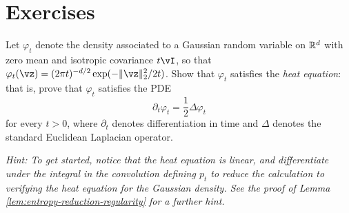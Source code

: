 \documentclass[../../book-main.tex]{subfiles}
\begin{document}
\section{Exercises}

\begin{exercise}\label{exercise:gaussian-heat}
  Let $\varphi_t$ denote the density associated to a Gaussian random variable on
  $\mathbb{R}^d$
  with zero mean and isotropic covariance $t\vI$, so that $\varphi_t(\vz)
  = (2\pi t)^{-d/2} \exp(-\norm{\vz}_2^2/2t)$.
  Show that $\varphi_t$ satisfies the \textit{heat equation}: that is,
  prove that $\varphi_t$ satisfies the PDE
  \begin{equation*}
    \partial_t \varphi_t = \frac{1}{2}\Delta \varphi_t
  \end{equation*}
  for every $t > 0$, where $\partial_t$ denotes differentiation in time and
  $\Delta$ denotes the standard Euclidean Laplacian operator.

  \textit{Hint: To get started, notice that the heat equation is linear, and
  differentiate under the integral in the convolution defining $p_t$ to reduce the
  calculation to verifying the heat equation for the Gaussian density. See the
  proof of Lemma \ref{lem:entropy-reduction-regularity} for a further hint.}
\end{exercise}
\end{document}
